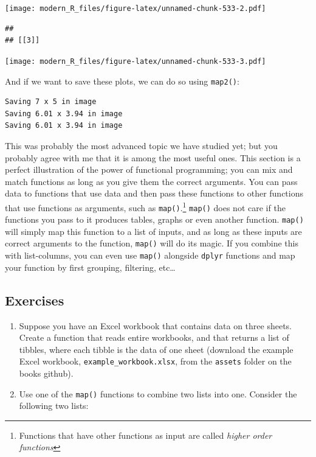 \documentclass[]{gitbook}
\newenvironment{Shaded}{\begin{snugshade}}{\end{snugshade}}
\newcommand{\KeywordTok}[1]{\textcolor[rgb]{0.13,0.29,0.53}{\textbf{#1}}}
\newcommand{\NormalTok}[1]{#1}
\newcommand{\OperatorTok}[1]{\textcolor[rgb]{0.81,0.36,0.00}{\textbf{#1}}}
\newcommand{\StringTok}[1]{\textcolor[rgb]{0.31,0.60,0.02}{#1}}
\let\rmarkdownfootnote\footnote%
\def\footnote{\protect\rmarkdownfootnote}
\theoremstyle{definition}
\theoremstyle{definition}
\theoremstyle{definition}
\theoremstyle{remark}
\begin{document}
\texttt{[image: modern\_R\_files/figure-latex/unnamed-chunk-533-2.pdf]}

\begin{verbatim}
## 
## [[3]]
\end{verbatim}

\texttt{[image: modern\_R\_files/figure-latex/unnamed-chunk-533-3.pdf]}

And if we want to save these plots, we can do so using \texttt{map2()}:

\begin{Shaded}
\end{Shaded}

\begin{verbatim}
Saving 7 x 5 in image
Saving 6.01 x 3.94 in image
Saving 6.01 x 3.94 in image
\end{verbatim}

This was probably the most advanced topic we have studied yet; but you
probably agree with me that it is among the most useful ones. This
section is a perfect illustration of the power of functional
programming; you can mix and match functions as long as you give them
the correct arguments. You can pass data to functions that use data and
then pass these functions to other functions that use functions as
arguments, such as \texttt{map()}.\footnote{Functions that have other
  functions as input are called \emph{higher order functions}}
\texttt{map()} does not care if the functions you pass to it produces
tables, graphs or even another function. \texttt{map()} will simply map
this function to a list of inputs, and as long as these inputs are
correct arguments to the function, \texttt{map()} will do its magic. If
you combine this with list-columns, you can even use \texttt{map()}
alongside \texttt{dplyr} functions and map your function by first
grouping, filtering, etc\ldots{}

\hypertarget{exercises-6}{%
\subsection{Exercises}\label{exercises-6}}

\begin{enumerate}
\def\labelenumi{\arabic{enumi}.}
\item
  Suppose you have an Excel workbook that contains data on three sheets.
  Create a function that reads entire workbooks, and that returns a list
  of tibbles, where each tibble is the data of one sheet (download the
  example Excel workbook, \texttt{example\_workbook.xlsx}, from the
  \texttt{assets} folder on the books github).
\item
  Use one of the \texttt{map()} functions to combine two lists into one.
  Consider the following two lists:
\end{enumerate}
\end{document}
